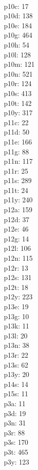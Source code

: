 \begin{multicols}{8}
  \\ p10c: 17
  \\ p10d: 138
  \\ p10e: 184
  \\ p10g: 464
  \\ p10h: 54
  \\ p10l: 128
  \\ p10m: 121
  \\ p10n: 521
  \\ p10r: 124
  \\ p10s: 413
  \\ p10t: 142
  \\ p10y: 317
  \\ p11c: 22
  \\ p11d: 50
  \\ p11e: 166
  \\ p11g: 88
  \\ p11n: 117
  \\ p11r: 25
  \\ p11s: 289
  \\ p11t: 24
  \\ p11y: 240
  \\ p12a: 159
  \\ p12d: 37
  \\ p12e: 46
  \\ p12g: 14
  \\ p12l: 106
  \\ p12n: 115
  \\ p12r: 13
  \\ p12s: 131
  \\ p12t: 18
  \\ p12y: 223
  \\ p13e: 19
  \\ p13g: 10
  \\ p13k: 11
  \\ p13l: 20
  \\ p13n: 38
  \\ p13r: 22
  \\ p13s: 62
  \\ p13y: 20
  \\ p14s: 14
  \\ p15s: 11
  \\ p3a: 11
  \\ p3d: 19
  \\ p3n: 31
  \\ p3r: 88
  \\ p3s: 170
  \\ p3t: 465
  \\ p3y: 123

\end{multicols}
